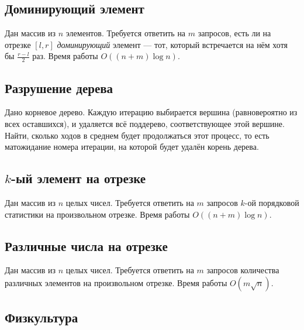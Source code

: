 \documentclass[11pt]{article}
\begin{document}
    \subsection{Доминирующий
элемент}\label{ux434ux43eux43cux438ux43dux438ux440ux443ux44eux449ux438ux439-ux44dux43bux435ux43cux435ux43dux442}

Дан массив из \(n\) элементов. Требуется ответить на \(m\) запросов,
есть ли на отрезке \([l, r]\) \emph{доминирующий} элемент --- тот,
который встречается на нём хотя бы \(\frac{r-l}{2}\) раз. Время работы
\(O((n+m) \log n)\).

    \subsection{Разрушение
дерева}\label{ux440ux430ux437ux440ux443ux448ux435ux43dux438ux435-ux434ux435ux440ux435ux432ux430}

Дано корневое дерево. Каждую итерацию выбирается вершина (равновероятно
из всех оставшихся), и удаляется всё поддерево, соответствующее этой
вершине. Найти, сколько ходов в среднем будет продолжаться этот процесс,
то есть матожидание номера итерации, на которой будет удалён корень
дерева.

    \subsection{\texorpdfstring{\(k\)-ый элемент на
отрезке}{k-ый элемент на отрезке}}\label{k-ux44bux439-ux44dux43bux435ux43cux435ux43dux442-ux43dux430-ux43eux442ux440ux435ux437ux43aux435}

Дан массив из \(n\) целых чисел. Требуется ответить на \(m\) запросов
\(k\)-ой порядковой статистики на произвольном отрезке. Время работы
\(O((n+m) \log n)\).

    \subsection{Различные числа на
отрезке}\label{ux440ux430ux437ux43bux438ux447ux43dux44bux435-ux447ux438ux441ux43bux430-ux43dux430-ux43eux442ux440ux435ux437ux43aux435}

Дан массив из \(n\) целых чисел. Требуется ответить на \(m\) запросов
количества различных элементов на произвольном отрезке. Время работы
\(O(m\sqrt{n})\).

    \subsection{Физкультура}\label{ux444ux438ux437ux43aux443ux43bux44cux442ux443ux440ux430}
\end{document}
